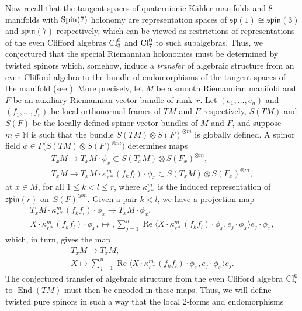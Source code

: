 \documentclass[10pt,a4paper]{amsart}
\newcommand{\lra}{\longrightarrow}
\numberwithin{equation}{section}
\begin{document}
Now recall that the tangent spaces of quaternionic K\"ahler manifolds and 8-manifolds with ${\rm Spin}(7)$ holonomy
are representation spaces of $\mathfrak{sp}(1)\cong \mathfrak{spin}(3)$ and $\mathfrak{spin}(7)$ respectively,
which can be viewed as restrictions of representations of the even Clifford algebras ${\rm Cl}_3^0$ and ${\rm Cl}_7^0$ to such subalgebras.
Thus, we conjectured that the special Riemannian holonomies must be determined by twisted spinors which,
somehow, induce a {\em transfer} of algebraic
structure from an even Clifford algebra to the bundle of endomorphisms of the tangent spaces of the manifold (see \cite{Santana}).
More precisely,
let $M$ be a smooth Riemannian manifold and $F$ be an auxiliary Riemannian vector bundle of rank~$r$.
Let $(e_1,\dots ,e_n)$ and $(f_1,\dots ,f_r)$ be local orthonormal frames of $TM$ and $F$ respectively,
$S(TM)$ and $S(F)$ be the locally defined
spinor vector bundles of $M$ and $F$, and suppose $m\in\mathbb{N}$ is such that the bundle
$S(TM)\otimes S(F)^{\otimes m}$ is globally defined.
A spinor field $\phi\in\Gamma\big(S(TM)\otimes S(F)^{\otimes m}\big)$ determines maps
\begin{gather*}
 T_xM \lra T_xM\cdot\phi_x \subset S(T_xM)\otimes S(F_x)^{\otimes m} ,\\
 T_xM \lra T_xM\cdot \kappa_{r*}^m(f_kf_l)\cdot \phi_x \subset S(T_xM)\otimes S(F_x)^{\otimes m} ,
\end{gather*}
at $x\in M$, for all $1\leq k<l\leq r$, where $\kappa_{r*}^m$ is the induced representation of~$\mathfrak{spin}(r)$ on~$S(F)^{\otimes m}$.
Given a pair $k<l$, we have a projection map
\begin{gather*}
 T_xM\cdot \kappa_{r*}^m(f_kf_l)\cdot \phi_x \lra T_xM\cdot \phi_x,\\
 X\cdot \kappa_{r*}^m(f_kf_l)\cdot \phi_x ,\longmapsto, \sum_{j=1}^n
\operatorname{Re}\big\langle X\cdot \kappa_{r*}^m(f_kf_l)\cdot \phi_x,e_j\cdot \phi_x\big\rangle e_j\cdot\phi_x,
\end{gather*}
which, in turn, gives the map
\begin{gather*}
 T_xM \lra T_xM,\\
 X \longmapsto \sum_{j=1}^n \operatorname{Re}\big\langle X\cdot \kappa_{r*}^m(f_kf_l)\cdot \phi_x,e_j\cdot \phi_x\big\rangle e_j.
\end{gather*}
The conjectured transfer of algebraic structure from the even Clifford algebra ${\rm Cl}_r^0$ to $\operatorname{End}(TM)$ must then be encoded in these maps.
Thus, we will define twisted pure spinors in such a way that the local $2$-forms and endomorphisms
\end{document}
